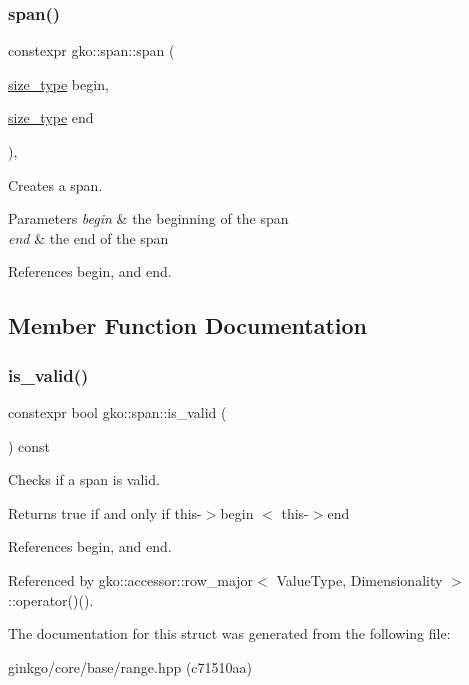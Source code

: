 \subsubsection{\texorpdfstring{span()}{span()}\hspace{0.1cm}{\footnotesize\ttfamily [2/2]}}
{\footnotesize\ttfamily constexpr gko\+::span\+::span (\begin{DoxyParamCaption}\item[{\hyperlink{namespacegko_a6e5c95df0ae4e47aab2f604a22d98ee7}{size\+\_\+type}}]{begin,  }\item[{\hyperlink{namespacegko_a6e5c95df0ae4e47aab2f604a22d98ee7}{size\+\_\+type}}]{end }\end{DoxyParamCaption})\hspace{0.3cm}{\ttfamily [inline]}, {\ttfamily [noexcept]}}



Creates a span. 


\begin{DoxyParams}{Parameters}
{\em begin} & the beginning of the span \\
\hline
{\em end} & the end of the span \\
\hline
\end{DoxyParams}


References begin, and end.



\subsection{Member Function Documentation}
\mbox{\label{structgko_1_1span_a32a87f434708e6857820858503f9b133}} 
\subsubsection{\texorpdfstring{is\+\_\+valid()}{is\_valid()}}
{\footnotesize\ttfamily constexpr bool gko\+::span\+::is\+\_\+valid (\begin{DoxyParamCaption}{ }\end{DoxyParamCaption}) const\hspace{0.3cm}{\ttfamily [inline]}}



Checks if a span is valid. 

\begin{DoxyReturn}{Returns}
true if and only if {\ttfamily this-\/$>$begin $<$ this-\/$>$end} 
\end{DoxyReturn}


References begin, and end.



Referenced by gko\+::accessor\+::row\+\_\+major$<$ Value\+Type, Dimensionality $>$\+::operator()().



The documentation for this struct was generated from the following file\+:\begin{DoxyCompactItemize}
\item 
ginkgo/core/base/range.\+hpp (c71510aa)\end{DoxyCompactItemize}
